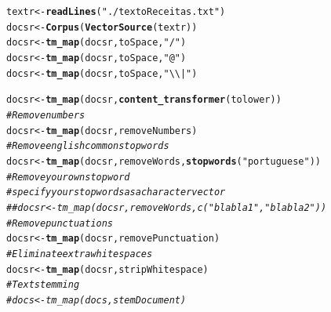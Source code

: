 \documentclass[12pt,a4paper]{article}\usepackage[]{graphicx}\usepackage[]{color}
\makeatletter
\newcommand{\hlstr}[1]{\textcolor[rgb]{0.192,0.494,0.8}{#1}}%
\newcommand{\hlcom}[1]{\textcolor[rgb]{0.678,0.584,0.686}{\textit{#1}}}%
\newcommand{\hlstd}[1]{\textcolor[rgb]{0.345,0.345,0.345}{#1}}%
\newcommand{\hlkwb}[1]{\textcolor[rgb]{0.69,0.353,0.396}{#1}}%
\newcommand{\hlkwd}[1]{\textcolor[rgb]{0.737,0.353,0.396}{\textbf{#1}}}%
\newenvironment{kframe}{%
 \def\at@end@of@kframe{}%
 \ifinner\ifhmode%
  \def\at@end@of@kframe{\end{minipage}}%
  \begin{minipage}{\columnwidth}%
 \fi\fi%
 \def\FrameCommand##1{\hskip\@totalleftmargin \hskip-\fboxsep
 \colorbox{shadecolor}{##1}\hskip-\fboxsep
     \hskip-\linewidth \hskip-\@totalleftmargin \hskip\columnwidth}%
 \MakeFramed {\advance\hsize-\width
   \@totalleftmargin\z@ \linewidth\hsize
   \@setminipage}}%
 {\par\unskip\endMakeFramed%
 \at@end@of@kframe}
\newenvironment{knitrout}{}{} %
\makeatother
\begin{document}
\begin{knitrout}\small
{}\color{fgcolor}\begin{kframe}
\begin{alltt}
\hlstd{textr} \hlkwb{<-} \hlkwd{readLines}\hlstd{(}\hlstr{"./textoReceitas.txt"}\hlstd{)}
\hlstd{docsr} \hlkwb{<-} \hlkwd{Corpus}\hlstd{(}\hlkwd{VectorSource}\hlstd{(textr))}
\hlstd{docsr} \hlkwb{<-} \hlkwd{tm_map}\hlstd{(docsr, toSpace,} \hlstr{"/"}\hlstd{)}
\hlstd{docsr} \hlkwb{<-} \hlkwd{tm_map}\hlstd{(docsr, toSpace,} \hlstr{"@"}\hlstd{)}
\hlstd{docsr} \hlkwb{<-} \hlkwd{tm_map}\hlstd{(docsr, toSpace,} \hlstr{"\textbackslash{}\textbackslash{}|"}\hlstd{)}

\hlstd{docsr} \hlkwb{<-} \hlkwd{tm_map}\hlstd{(docsr,} \hlkwd{content_transformer}\hlstd{(tolower))}
\hlcom{# Remove numbers}
\hlstd{docsr} \hlkwb{<-} \hlkwd{tm_map}\hlstd{(docsr, removeNumbers)}
\hlcom{# Remove english common stopwords}
\hlstd{docsr} \hlkwb{<-} \hlkwd{tm_map}\hlstd{(docsr, removeWords,} \hlkwd{stopwords}\hlstd{(}\hlstr{"portuguese"}\hlstd{))}
\hlcom{# Remove your own stop word}
\hlcom{# specify your stopwords as a character vector}
\hlcom{##docsr <- tm_map(docsr, removeWords, c("blabla1", "blabla2")) }
\hlcom{# Remove punctuations}
\hlstd{docsr} \hlkwb{<-} \hlkwd{tm_map}\hlstd{(docsr, removePunctuation)}
\hlcom{# Eliminate extra white spaces}
\hlstd{docsr} \hlkwb{<-} \hlkwd{tm_map}\hlstd{(docsr, stripWhitespace)}
\hlcom{# Text stemming}
\hlcom{# docs <- tm_map(docs, stemDocument)}


\end{alltt}
\end{kframe}
\end{knitrout}
\end{document}
